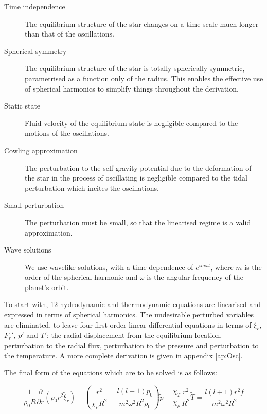\documentclass[11pt]{amsart}
\begin{document}
\begin{description}
\item[Time independence]
 The equilibrium structure of the star changes on a time-scale much longer than that of the oscillations.
 
 \item[Spherical symmetry]
 The equilibrium structure of the star is totally spherically symmetric, parametrised as a function only of the radius.  This enables the effective use of spherical harmonics to simplify things throughout the derivation.
 
 \item[Static state]
 Fluid velocity of the equilibrium state is negligible compared to the motions of the oscillations.
 
 \item[Cowling approximation]
 The perturbation to the self-gravity potential due to the deformation of the star in the process of oscillating is negligible compared to the tidal perturbation which incites the oscillations.
 
 \item[Small perturbation]
 The perturbation must be small, so that the linearised regime is a valid approximation.
 
 \item[Wave solutions]
 We use wavelike solutions, with a time dependence of $e^{i m \omega t}$, where $m$ is the order of the spherical harmonic and $\omega$ is the angular frequency of the planet's orbit.
\end{description}


To start with, 12 hydrodynamic and thermodynamic equations are linearised and expressed in terms of spherical harmonics. The undesirable perturbed variables are eliminated, to leave four first order linear differential equations in terms of $\xi_{r}$, $F_{r}'$, $p'$ and $T'$; the radial displacement from the equilibrium location, perturbation to the radial flux, perturbation to the pressure and perturbation to the temperature.  A more complete derivation is given in appendix \ref{ap:Osc}.

The final form of the equations which are to be solved is as follows:


\begin{equation} \label{eq:cont_osc_dim2}
\frac{1}{\rho_{0} R}  \frac{\partial}{\partial r}\left( \rho_{0} r^{2} \tilde{\xi}_{r} \right)
+ \left( \frac{r^{2}}{\chi_{\rho} R^{2}} - \frac{l (l+1) p_{0}}{m^{2} \omega^{2} R^{2} \rho_{0} } \right) \tilde{p}
- \frac{\chi_{T}}{\chi_{\rho}} \frac{r^{2}}{R^{2}} \tilde{T}
=
\frac{l (l+1) r^{2} f}{m^{2} \omega^{2} R^{2}}
\end{equation}
\end{document}
